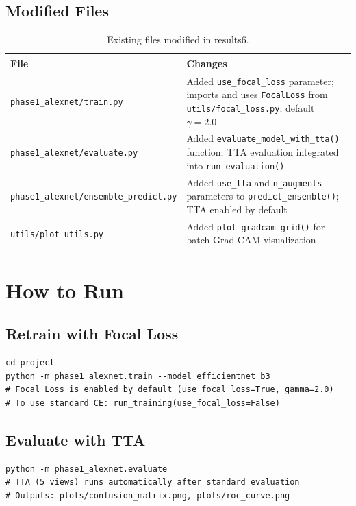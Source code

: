 \documentclass[11pt]{article}
\begin{document}
\subsection{Modified Files}

\begin{table}[H]
\centering
\renewcommand{\arraystretch}{1.2}
\begin{tabularx}{\textwidth}{lX}
\toprule
\textbf{File} & \textbf{Changes} \\
\midrule
\texttt{phase1\_alexnet/train.py} & Added \texttt{use\_focal\_loss} parameter; imports and uses \texttt{FocalLoss} from \texttt{utils/focal\_loss.py}; default $\gamma=2.0$ \\
\texttt{phase1\_alexnet/evaluate.py} & Added \texttt{evaluate\_model\_with\_tta()} function; TTA evaluation integrated into \texttt{run\_evaluation()} \\
\texttt{phase1\_alexnet/ensemble\_predict.py} & Added \texttt{use\_tta} and \texttt{n\_augments} parameters to \texttt{predict\_ensemble()}; TTA enabled by default \\
\texttt{utils/plot\_utils.py} & Added \texttt{plot\_gradcam\_grid()} for batch Grad-CAM visualization \\
\bottomrule
\end{tabularx}
\caption{Existing files modified in results6.}
\end{table}

\section{How to Run}

\subsection{Retrain with Focal Loss}
\begin{verbatim}
cd project
python -m phase1_alexnet.train --model efficientnet_b3
# Focal Loss is enabled by default (use_focal_loss=True, gamma=2.0)
# To use standard CE: run_training(use_focal_loss=False)
\end{verbatim}

\subsection{Evaluate with TTA}
\begin{verbatim}
python -m phase1_alexnet.evaluate
# TTA (5 views) runs automatically after standard evaluation
# Outputs: plots/confusion_matrix.png, plots/roc_curve.png
\end{verbatim}
\end{document}
